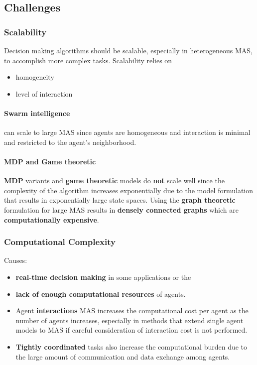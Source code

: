 \documentclass{article}
\begin{document}
			\subsection{Challenges}
				\subsubsection{Scalability}
				Decision making algorithms should be scalable, especially in heterogeneous MAS, to accomplish more complex tasks. 
				Scalability relies on 
					\begin{itemize}
						\item homogeneity
						\item level of interaction
					\end{itemize}
				
				 \paragraph{Swarm intelligence} can scale to large MAS since agents are homogeneous and interaction is minimal and restricted to the agent’s neighborhood. 
				 
				 \paragraph{MDP and Game theoretic} \textbf{MDP} variants and \textbf{game theoretic} models do \textbf{not} scale well since the complexity of the algorithm increases exponentially due to the model formulation that results in exponentially large state spaces. Using the \textbf{graph theoretic} formulation for large MAS results in \textbf{densely connected graphs} which are \textbf{computationally expensive}.
					
					
				
				\subsubsection{Computational Complexity}
					Causes:
					\begin{itemize}
						\item \textbf{real-time decision making} in some applications or the 
						
						\item \textbf{lack of enough computational resources} of agents. 
						
						\item Agent \textbf{interactions} MAS increases the computational cost per agent as the number of agents increases, especially in methods that extend single agent models to MAS if careful consideration of interaction cost is not performed. 
						
						\item \textbf{Tightly coordinated} tasks also increase the computational burden due to the large amount of communication and data exchange among agents. 
					\end{itemize}
				
\end{document}
